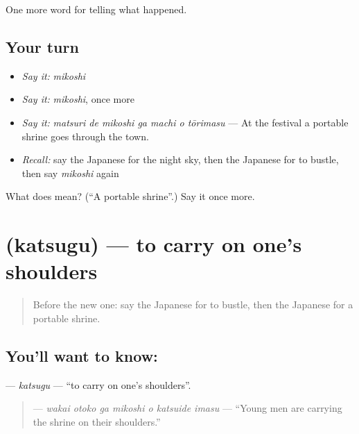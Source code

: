 \begin{grammarlens}[title={What you've built}]
One more word for telling what happened.
\end{grammarlens}

\subsection*{Your turn}
\begin{itemize}
\raggedright
  \item \emph{Say it:} \emph{mikoshi}
  \item \emph{Say it:} \emph{mikoshi}, once more
  \item \emph{Say it:} \emph{matsuri de mikoshi ga machi o tōrimasu} — At the festival a portable shrine goes through the town.
  \item \emph{Recall:} say the Japanese for the night sky, then the Japanese for to bustle, then say \emph{mikoshi} again
\end{itemize}

\begin{tcolorbox}[breakable,colback=teal!4,colframe=teal!35!black,title={Before you move on}]
What does  mean? (\textquotedblleft{}A portable shrine\textquotedblright{}.) Say it once more.
\end{tcolorbox}
\section[\texorpdfstring{\ja{かつぐ} (katsugu)}{かつぐ (katsugu)}]{ (katsugu) — to carry on one's shoulders}

\label{lesson:JA-C294-katsugu}



\begin{quote}
Before the new one: say the Japanese for to bustle, then the Japanese for a portable shrine.
\end{quote}

\subsection*{You'll want to know: }
\textbf{} — \emph{katsugu} — \textquotedblleft{}to carry on one's shoulders\textquotedblright{}.

\begin{quote}
\textbf{   } — \emph{wakai otoko ga mikoshi o katsuide imasu} — \textquotedblleft{}Young men are carrying the shrine on their shoulders.\textquotedblright{}
\end{quote}

